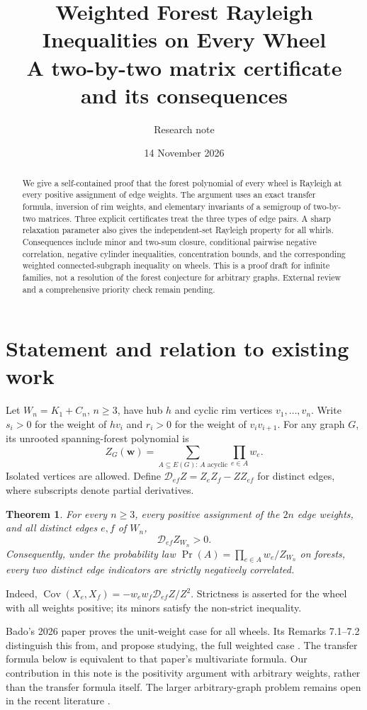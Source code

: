 \documentclass[11pt]{article}
\title{Weighted Forest Rayleigh Inequalities on Every Wheel\\\large A two-by-two matrix certificate and its consequences}
\author{Research note}
\date{14 November 2026}
\newtheorem{theorem}{Theorem}
\newcommand{\Cov}{\operatorname{Cov}}
\newcommand{\Del}{\mathcal D}
\begin{document}
\maketitle
\begin{abstract}
We give a self-contained proof that the forest polynomial of every wheel is Rayleigh at every positive assignment of edge weights. The argument uses an exact transfer formula, inversion of rim weights, and elementary invariants of a semigroup of two-by-two matrices. Three explicit certificates treat the three types of edge pairs. A sharp relaxation parameter also gives the independent-set Rayleigh property for all whirls. Consequences include minor and two-sum closure, conditional pairwise negative correlation, negative cylinder inequalities, concentration bounds, and the corresponding weighted connected-subgraph inequality on wheels. This is a proof draft for infinite families, not a resolution of the forest conjecture for arbitrary graphs. External review and a comprehensive priority check remain pending.
\end{abstract}

\section{Statement and relation to existing work}
Let $W_n=K_1+C_n$, $n\ge3$, have hub $h$ and cyclic rim vertices $v_1,\ldots,v_n$. Write $s_i>0$ for the weight of $hv_i$ and $r_i>0$ for the weight of $v_iv_{i+1}$. For any graph $G$, its unrooted spanning-forest polynomial is
\[
 Z_G(\boldsymbol w)=\sum_{A\subseteq E(G):\,A\text{ acyclic}}\prod_{e\in A}w_e.
\]
Isolated vertices are allowed. Define $\Del_{ef} Z=Z_eZ_f-ZZ_{ef}$ for distinct edges, where subscripts denote partial derivatives.

\begin{theorem}\label{thm:main}
For every $n\ge3$, every positive assignment of the $2n$ edge weights, and all distinct edges $e,f$ of $W_n$,
\[
\Del_{ef}Z_{W_n}>0.
\]
Consequently, under the probability law $\Pr(A)=\prod_{e\in A}w_e/Z_{W_n}$ on forests, every two distinct edge indicators are strictly negatively correlated.
\end{theorem}

Indeed, $\Cov(X_e,X_f)=-w_ew_f\Del_{ef}Z/Z^2$. Strictness is asserted for the wheel with all weights positive; its minors satisfy the non-strict inequality.

Bado's 2026 paper proves the unit-weight case for all wheels. Its Remarks 7.1--7.2 distinguish this from, and propose studying, the full weighted case \cite{Bado}. The transfer formula below is equivalent to that paper's multivariate formula. Our contribution in this note is the positivity argument with arbitrary weights, rather than the transfer formula itself. The larger arbitrary-graph problem remains open in the recent literature \cite{CR}.
\end{document}

